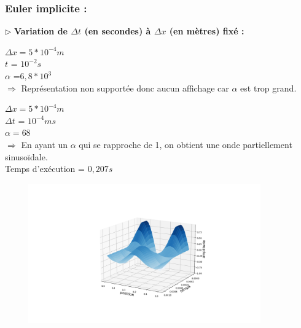 \subsubsection{Euler implicite :}

$\triangleright$ \textbf{Variation de $\Delta t$ (en secondes) à $\Delta x$ (en mètres) fixé :}\\
\begin{enumerate}[label=\alph*)]


\begin{minipage}{.5\textwidth}%

\item $\Delta x =  5*{10}^{-4}m$\\
$t$ = ${10}^{-2} s $\\
$\alpha$ =$6,8*{10}^{3}$\\

$\Longrightarrow$ Représentation non supportée donc aucun affichage car $\alpha$ est trop grand.\\ 

\end{minipage}%




\begin{minipage}{.5\textwidth}%
\item $\Delta x = 5*{10}^{-4}m $\\
$\Delta t$ = ${10}^{-4}m s $ \\
$\alpha =68$ \\

$\Longrightarrow$ En ayant un $\alpha$ qui se rapproche de 1, on obtient une onde partiellement sinusoïdale.\\
Temps d'exécution = $0,207s$

\end{minipage}%
\hfill
\begin{minipage}{.45\textwidth}%
\includegraphics[width=12cm,height=6cm]{implicitec.png}
\end{minipage}%


\end{enumerate}
